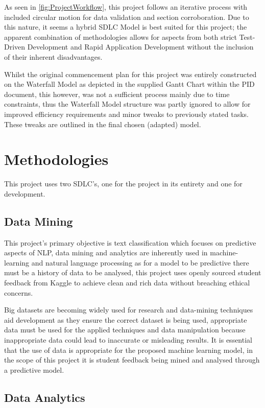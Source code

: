 As seen in \autoref{fig:ProjectWorkflow}, this project follows an iterative process with included circular motion for data validation and section corroboration. Due to this nature, it seems a hybrid SDLC Model is best suited for this project; the apparent combination of methodologies allows for aspects from both strict Test-Driven Development and Rapid Application Development without the inclusion of their inherent disadvantages.

Whilst the original commencement plan for this project was entirely constructed on the Waterfall Model as depicted in the supplied Gantt Chart within the PID document, this however, was not a sufficient process mainly due to time constraints, thus the Waterfall Model structure was partly ignored to allow for improved efficiency requirements and minor tweaks to previously stated tasks. These tweaks are outlined in the final chosen (adapted) model.

\section{Methodologies}

This project uses two SDLC’s, one for the project in its entirety and one for development.

\subsection{Data Mining}

This project’s primary objective is text classification which focuses on predictive aspects of NLP, data mining and analytics are inherently used in machine-learning and natural language processing as for a model to be predictive there must be a history of data to be analysed, this project uses openly sourced student feedback from Kaggle to achieve clean and rich data without breaching ethical concerns.

Big datasets are becoming widely used for research and data-mining techniques aid development as they ensure the correct dataset is being used, appropriate data must be used for the applied techniques and data manipulation because inappropriate data could lead to inaccurate or misleading results. It is essential that the use of data is appropriate for the proposed machine learning model, in the scope of this project it is student feedback being mined and analysed through a predictive model.

\subsection{Data Analytics}


